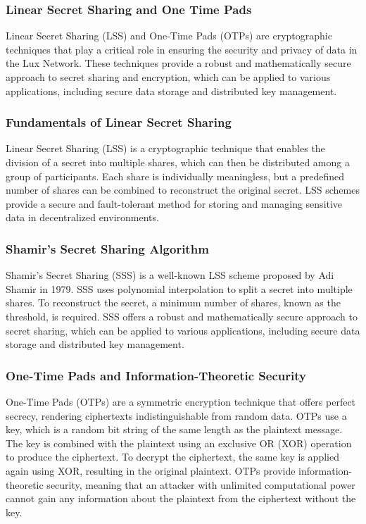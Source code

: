 \documentclass[11pt]{article}
\begin{document}
\subsubsection{Linear Secret Sharing and One Time Pads}

Linear Secret Sharing (LSS) and One-Time Pads (OTPs) are cryptographic techniques that play a critical role in ensuring the security and privacy of data in the Lux Network. These techniques provide a robust and mathematically secure approach to secret sharing and encryption, which can be applied to various applications, including secure data storage and distributed key management.


\subsubsection{Fundamentals of Linear Secret Sharing}

Linear Secret Sharing (LSS) is a cryptographic technique that enables the division of a secret into multiple shares, which can then be distributed among a group of participants. Each share is individually meaningless, but a predefined number of shares can be combined to reconstruct the original secret. LSS schemes provide a secure and fault-tolerant method for storing and managing sensitive data in decentralized environments.


\subsubsection{Shamir's Secret Sharing Algorithm}

Shamir's Secret Sharing (SSS) is a well-known LSS scheme proposed by Adi Shamir in 1979. SSS uses polynomial interpolation to split a secret into multiple shares. To reconstruct the secret, a minimum number of shares, known as the threshold, is required. SSS offers a robust and mathematically secure approach to secret sharing, which can be applied to various applications, including secure data storage and distributed key management.


\subsubsection{One-Time Pads and Information-Theoretic Security}

One-Time Pads (OTPs) are a symmetric encryption technique that offers perfect secrecy, rendering ciphertexts indistinguishable from random data. OTPs use a key, which is a random bit string of the same length as the plaintext message. The key is combined with the plaintext using an exclusive OR (XOR) operation to produce the ciphertext. To decrypt the ciphertext, the same key is applied again using XOR, resulting in the original plaintext. OTPs provide information-theoretic security, meaning that an attacker with unlimited computational power cannot gain any information about the plaintext from the ciphertext without the key.
\end{document}
